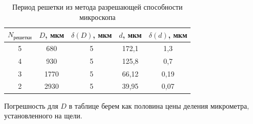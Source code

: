 \documentclass[a4paper, 12pt]{article}%
\begin{document}
\begin{table}[h!]
\begin{center}
\begin{tabular}{|c|c|c|c|c|}
\hline
$N_{\text{решетки}}$ & $D$, мкм & $\delta(D)$, мкм & $d$, мкм & $\delta(d)$, мкм \\ \hline
5                    & 680      & 5                & 172,1    & 1,3              \\ \hline
4                    & 930      & 5                & 125,8    & 0,7              \\ \hline
3                    & 1770     & 5                & 66,12    & 0,19             \\ \hline
2                    & 2930     & 5                & 39,95    & 0,07             \\ \hline
\end{tabular}
\caption{Период решетки из метода разрешающей способности микроскопа}
\end{center}
\end{table}

Погрешность для $D$ в таблице берем как половина цены деления микрометра, установленного на щели.
\end{document}
